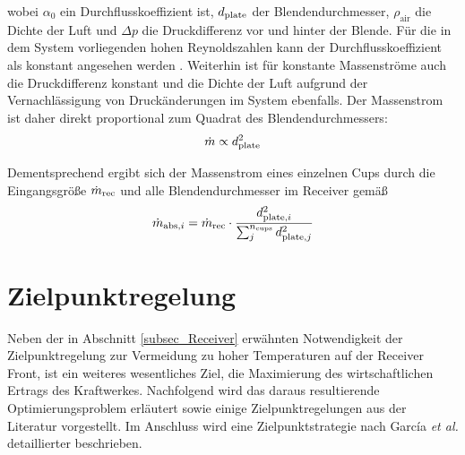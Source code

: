 \vspace*{-\baselineskip}wobei $\alpha_0$ ein Durchflusskoeffizient ist, $\OrificeDiameter$ der Blendendurchmesser, $\rho_{\mathrm{air}}$ die Dichte der Luft und $\Delta p$ die Druckdifferenz vor und hinter der Blende.
Für die in dem System vorliegenden hohen Reynoldszahlen kann der Durchflusskoeffizient als konstant angesehen werden \cite{IdingSolarPaces}.
Weiterhin ist für konstante Massenströme auch die Druckdifferenz konstant und die Dichte der Luft aufgrund der Vernachlässigung von Druckänderungen im System ebenfalls.
Der Massenstrom ist daher direkt proportional zum Quadrat des Blendendurchmessers:
\begin{equation} \label{eq_AbhängigkeitMassenstrom}
    \dot{m} \propto \OrificeDiameter^2
\end{equation}

Dementsprechend ergibt sich der Massenstrom eines einzelnen Cups durch die Eingangsgröße $\MDotReceiver$ und alle Blendendurchmesser im Receiver gemäß
\begin{equation} \label{eq_BerechnungMassenstrom}
    \dot{m}_{\IndexAbsorber, i} =\MDotReceiver \cdot \frac{\OrificeDiameter[,i]^2}{\sum_j^{n_{\mathrm{cups}}}\OrificeDiameter[,j]^2}
\end{equation}


\section{Zielpunktregelung} \label{sec_Zielpunktregelung}
Neben der in Abschnitt \ref{subsec_Receiver} erwähnten Notwendigkeit der Zielpunktregelung zur Vermeidung zu hoher Temperaturen auf der Receiver Front, ist ein weiteres wesentliches Ziel, die Maximierung des wirtschaftlichen Ertrags des Kraftwerkes.
Nachfolgend wird das daraus resultierende Optimierungsproblem erläutert sowie einige Zielpunktregelungen aus der Literatur vorgestellt.
Im Anschluss wird eine Zielpunktstrategie nach García \textit{et al.} \cite{Garcia2} detaillierter beschrieben.

